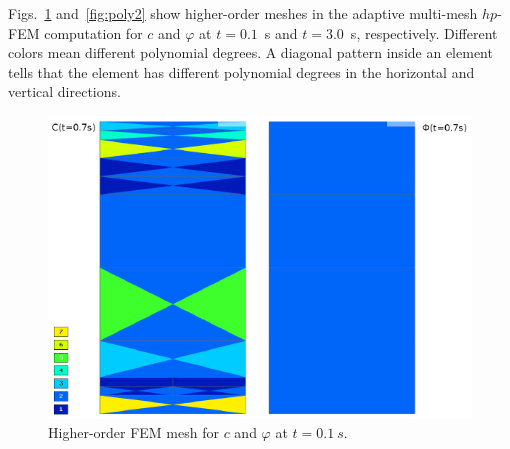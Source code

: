 \noindent 
Figs.~\ref{fig:poly} and~\ref{fig:poly2} show higher-order meshes in the adaptive multi-mesh $hp$-FEM
computation for $c$ and $\varphi$ at $t = 0.1$~s and $t=3.0$~s, respectively. Different 
colors mean different polynomial degrees. A diagonal pattern inside an element 
tells that the element has different polynomial degrees in the 
horizontal and vertical directions. 


\begin{figure}[!ht]
  \begin{centering}
  \includegraphics[width=.75\columnwidth]{poly}
  \caption{\label{fig:poly} Higher-order FEM mesh for 
  $c$ and $\varphi$ at $t=0.1\ s$. }
  \end{centering}
\end{figure}

